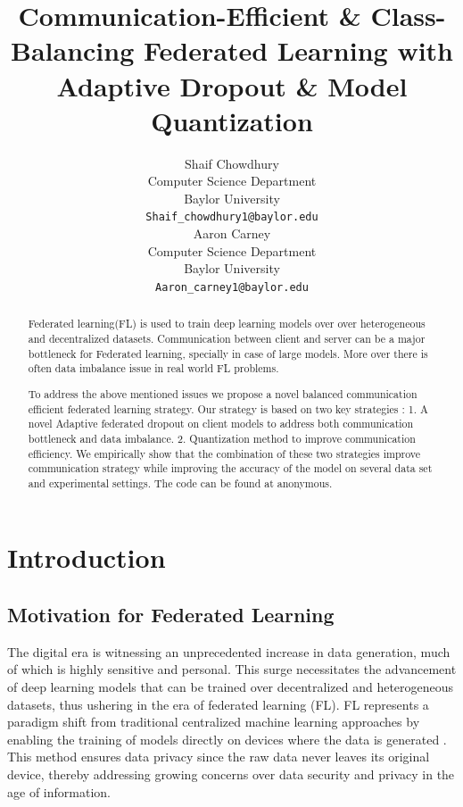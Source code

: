 \documentclass{article}
\title{Communication-Efficient \& Class-Balancing Federated Learning with Adaptive Dropout \& Model Quantization}
\author{%
  Shaif Chowdhury \\
  Computer Science Department\\
  Baylor University\\
  \texttt{Shaif_chowdhury1@baylor.edu} \\
  \And
  Aaron Carney \\
  Computer Science Department\\
  Baylor University\\
  \texttt{Aaron_carney1@baylor.edu} \\
}
\begin{document}
\maketitle


%


\begin{abstract}

Federated learning(FL) is used to train deep learning models over over heterogeneous and decentralized datasets. Communication between client and server can be a major bottleneck for Federated learning, specially in case of large models. More over there is often data imbalance issue in real world FL problems. 

To address the above mentioned issues we propose a novel balanced communication efficient federated learning strategy. Our strategy is based on two key strategies : 1. A novel Adaptive federated dropout on client models to address both communication bottleneck and data imbalance. 2. Quantization method to improve communication efficiency. We empirically show that the combination of these two strategies improve communication strategy while improving the accuracy of the model on several data set and experimental settings. The code can be found at anonymous.

\end{abstract}

\section{Introduction}

\subsection{Motivation for Federated Learning}

The digital era is witnessing an unprecedented increase in data generation, much of which is highly sensitive and personal. This surge necessitates the advancement of deep learning models that can be trained over decentralized and heterogeneous datasets, thus ushering in the era of federated learning (FL). FL represents a paradigm shift from traditional centralized machine learning approaches by enabling the training of models directly on devices where the data is generated \cite{info13050263}. This method ensures data privacy since the raw data never leaves its original device, thereby addressing growing concerns over data security and privacy in the age of information\cite{mao2022communication, zhang2022homomorphic}.\par
\end{document}

